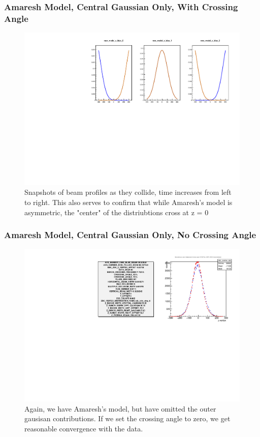 \begin{frame}
\frametitle{Amaresh Model, Central Gaussian Only, With Crossing Angle }
\begin{figure}
\begin{center}
\includegraphics[width=\linewidth]{../OverlapTest/figs/359711_model0c_angle_zprofile.pdf}
\end{center}
\caption{Snapshots of beam profiles as they collide, time increases from left to
right. This also serves to confirm that while Amaresh's model is asymmetric, the
"center" of the distriubtions cross at z = 0}
\label{fig:359711_model0c_angle_zprofile}
\end{figure}
\end{frame}

\begin{frame}
\frametitle{Amaresh Model, Central Gaussian Only, No Crossing Angle }
\begin{figure}
\begin{center}
\includegraphics[width=\linewidth]{../OverlapTest/figs/359711_model1c_noangle_vertex.pdf}
\end{center}
\caption{Again, we have Amaresh's model, but have omitted the outer gausisan
contributions. If we set the crossing angle to zero, we get reasonable
convergence with the data.}
\label{fig:359711_model1c_noangle_vertex}
\end{figure}
\end{frame}

